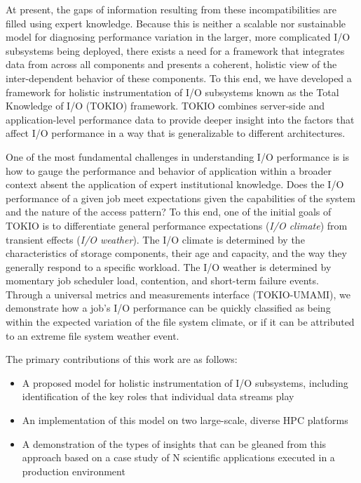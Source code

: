 At present, the gaps of information resulting from these incompatibilities are
filled using expert knowledge.  Because this is
neither a scalable nor sustainable model for diagnosing performance variation in
the larger, more complicated I/O subsystems being deployed, there exists a need
for a framework that integrates data from across all components and presents a
coherent, holistic view of the inter-dependent behavior of these components.  To
this end, we have developed a framework for holistic instrumentation of I/O
subsystems known as the Total Knowledge of I/O (TOKIO) framework.  TOKIO
combines server-side and application-level performance data to
provide deeper insight into the factors that affect I/O performance in a way
that is generalizable to different architectures.

One of the most fundamental challenges in understanding I/O performance
is is how to gauge the performance and behavior of application within a
broader context absent the application of expert institutional knowledge.
Does the I/O performance of a given job meet expectations given the
capabilities of the system and the nature of the access pattern?
To this end, one of the initial goals of TOKIO is to differentiate
general performance expectations (\emph{I/O climate}) from transient
effects (\emph{I/O weather}).  The I/O climate is determined by the
characteristics of storage components, their age and capacity, and the
way they generally respond to a specific workload.  The I/O weather is
determined by momentary job scheduler load, contention, and short-term
failure events.  Through a universal metrics and measurements interface
(TOKIO-UMAMI), we demonstrate how a job's I/O performance can be quickly
classified as being within the expected variation of the file system
climate, or if it can be attributed to an extreme file system weather
event.


The primary contributions of this work are as follows:

\begin{itemize}
\item A proposed model for holistic instrumentation of I/O subsystems,
including identification of the key roles that individual data streams play
\item An implementation of this model on two large-scale, diverse HPC
platforms
\item A demonstration of the types of insights that can be gleaned from this
approach based on a case study of N scientific applications executed in a
production environment
\end{itemize}

